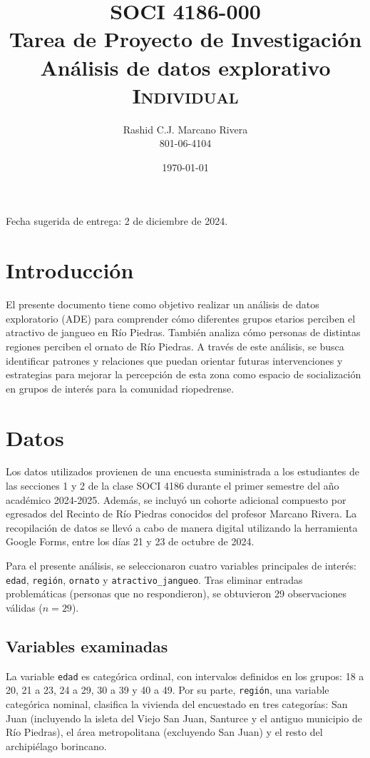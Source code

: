 \documentclass[11pt]{article}
\title{SOCI 4186-000    \\ Tarea de Proyecto de Investigación \textnumero 5 \\ Análisis de datos explorativo \\ \textsc{Individual}}
\author{Rashid C.J. Marcano Rivera \\ 801-06-4104}
\date{\today} %
\begin{document}
\singlespacing
\maketitle
Fecha sugerida de entrega: 2 de diciembre de 2024.


\section{Introducción}

El presente documento tiene como objetivo realizar un análisis de datos exploratorio (ADE) para comprender cómo diferentes grupos etarios perciben el atractivo de jangueo en Río Piedras. También analiza cómo personas de distintas regiones perciben el ornato de Río Piedras. A través de este análisis, se busca identificar patrones y relaciones que puedan orientar futuras intervenciones y estrategias para mejorar la percepción de esta zona como espacio de socialización en grupos de interés para la comunidad riopedrense.

\section{Datos}

Los datos utilizados provienen de una encuesta suministrada a los estudiantes de las secciones 1 y 2 de la clase SOCI 4186 durante el primer semestre del año académico 2024-2025. Además, se incluyó un cohorte adicional compuesto por egresados del Recinto de Río Piedras conocidos del profesor Marcano Rivera. La recopilación de datos se llevó a cabo de manera digital utilizando la herramienta Google Forms, entre los días 21 y 23 de octubre de 2024. 

Para el presente análisis, se seleccionaron cuatro variables principales de interés: \texttt{edad}, \texttt{región}, \texttt{ornato} y \texttt{atractivo\_jangueo}. Tras eliminar entradas problemáticas (personas que no respondieron), se obtuvieron 29 observaciones válidas ($n=29$).

\subsection{Variables examinadas}

La variable \texttt{edad} es categórica ordinal, con intervalos definidos en los grupos: 18 a 20, 21 a 23, 24 a 29, 30 a 39 y 40 a 49. Por su parte, \texttt{región}, una variable categórica nominal, clasifica la vivienda del encuestado en tres categorías: San Juan (incluyendo la isleta del Viejo San Juan, Santurce y el antiguo municipio de Río Piedras), el área metropolitana (excluyendo San Juan) y el resto del archipiélago borincano.
\end{document}
